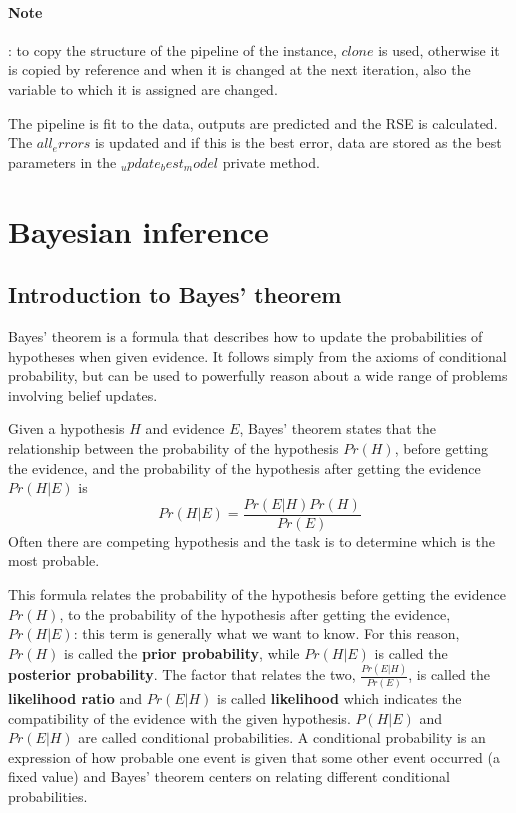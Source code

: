 \documentclass[12pt, letterpaper]{article}
\theoremstyle{definition}
\begin{document}
\paragraph{Note}: to copy the structure of the pipeline of the instance, $clone$ is used, otherwise it is copied by reference and when it is changed at the next iteration, also the variable to which it is assigned are changed.

The pipeline is fit to the data, outputs are predicted and the RSE is calculated. The $all_errors$ is updated and if this is the best error, data are stored as the best parameters in the $_update_best_model$ private method.

\newpage
\section{Bayesian inference}

\subsection{Introduction to Bayes' theorem}
Bayes' theorem is a formula that describes how to update the probabilities of hypotheses when given evidence. It follows simply from the axioms of conditional probability, but can be used to powerfully reason about a wide range of problems involving belief updates.

Given a hypothesis $H$ and evidence $E$, Bayes' theorem states that the relationship between the probability of the hypothesis $Pr(H)$, before getting the evidence, and the probability of the hypothesis after getting the evidence $Pr(H|E)$ is
\begin{equation}
Pr(H|E) = \frac{Pr(E|H)Pr(H)}{Pr(E)}
\end{equation}
Often there are competing hypothesis and the task is to determine which is the most probable.

This formula relates the probability of the hypothesis before getting the evidence $Pr(H)$, to the probability of the hypothesis after getting the evidence, $Pr(H|E)$: this term is generally what we want to know. For this reason, $Pr(H)$ is called the \textbf{prior probability}, while 
$Pr(H|E)$ is called the \textbf{posterior probability}. The factor that relates the two, $\frac{Pr(E|H)}{Pr(E)}$, is called the \textbf{likelihood ratio} and $Pr(E|H)$ is called \textbf{likelihood} which indicates the compatibility of the evidence with the given hypothesis.
$P(H|E)$ and $Pr(E|H)$ are called conditional probabilities. A conditional probability is an expression of how probable one event is given that some other event occurred (a fixed value) and Bayes' theorem centers on relating different conditional probabilities.
\end{document}
